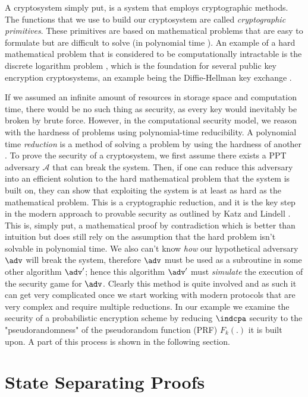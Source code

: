 \documentclass[bsc,frontabs,singlespacing,parskip,deptreport]{infthesis}
\begin{document}
A cryptosystem simply put, is a system that employs cryptographic methods. The functions that we use to build our cryptosystem are called \textit{cryptographic primitives}. These primitives are based on mathematical problems that are easy to formulate but are difficult to solve (in polynomial time \cite{pvnp}). An example of a hard mathematical problem that is considered to be computationally intractable is the discrete logarithm problem \cite{dlp}, which is the foundation for several public key encryption cryptosystems, an example being the Diffie-Hellman key exchange \cite{DH}.

If we assumed an infinite amount of resources in storage space and computation time, there would be no such thing as security, as every key would inevitably be broken by brute force. However, in the computational security model, we reason with the hardness of problems using polynomial-time reducibility. A polynomial time \textit{reduction} is a method of solving a problem by using the hardness of another \cite{complexity}. To prove the security of a cryptosystem, we first assume there exists a PPT adversary $\mathcal{A}$ that can break the system. Then, if one can reduce this adversary into an efficient solution to the hard mathematical problem that the system is built on, they can show that exploiting the system is at least as hard as the mathematical problem. This is a cryptographic reduction, and it is the key step in the modern approach to provable security as outlined by Katz and Lindell \cite{katz_lindell}. This is, simply put, a mathematical proof by contradiction which is better than intuition but does still rely on the assumption that the hard problem isn't solvable in polynomial time. We also can't know \textit{how} our hypothetical adversary $\adv$ will break the system, therefore $\adv$ must be used as a subroutine in some other algorithm $\adv'$; hence this algorithm $\adv'$ must \textit{simulate} the execution of the security game for $\adv$. Clearly this method is quite involved and as such it can get very complicated once we start working with modern protocols that are very complex and require multiple reductions. In our example we examine the security of a probabilistic encryption scheme by reducing $\indcpa$ security to the "pseudorandomness" of the pseudorandom function (PRF) $F_k(.)$ it is built upon. A part of this process is shown in the following section.   

\section{State Separating Proofs}\label{sec-ssp}
\end{document}

